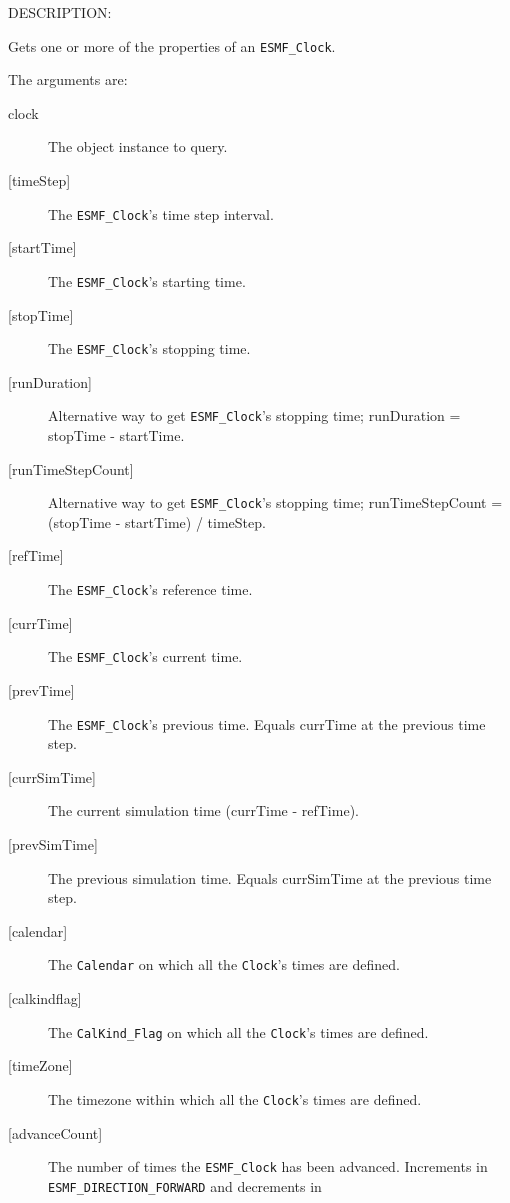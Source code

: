 {\sf DESCRIPTION:\\ }


       Gets one or more of the properties of an {\tt ESMF\_Clock}.
  
       The arguments are:
       \begin{description}
       \item[clock]
            The object instance to query.
       \item[{[timeStep]}]
            The {\tt ESMF\_Clock}'s time step interval.
       \item[{[startTime]}]
            The {\tt ESMF\_Clock}'s starting time.
       \item[{[stopTime]}]
            The {\tt ESMF\_Clock}'s stopping time.
       \item[{[runDuration]}]
            Alternative way to get {\tt ESMF\_Clock}'s stopping time;
               runDuration = stopTime - startTime.
       \item[{[runTimeStepCount]}]
            Alternative way to get {\tt ESMF\_Clock}'s stopping time;
               runTimeStepCount = (stopTime - startTime) / timeStep.
       \item[{[refTime]}]
            The {\tt ESMF\_Clock}'s reference time.
       \item[{[currTime]}]
            The {\tt ESMF\_Clock}'s current time.
       \item[{[prevTime]}]
            The {\tt ESMF\_Clock}'s previous time.  Equals currTime at
            the previous time step.
       \item[{[currSimTime]}]
            The current simulation time (currTime - refTime).
       \item[{[prevSimTime]}]
            The previous simulation time.  Equals currSimTime at
            the previous time step.
       \item[{[calendar]}]
            The {\tt Calendar} on which all the {\tt Clock}'s times are defined.
       \item[{[calkindflag]}]
            The {\tt CalKind\_Flag} on which all the {\tt Clock}'s times are
            defined.
       \item[{[timeZone]}]
            The timezone within which all the {\tt Clock}'s times are defined.
       \item[{[advanceCount]}]
            \begin{sloppypar}
            The number of times the {\tt ESMF\_Clock} has been advanced.
            Increments in {\tt ESMF\_DIRECTION\_FORWARD} and decrements in

\end{sloppypar}
\end{description}
